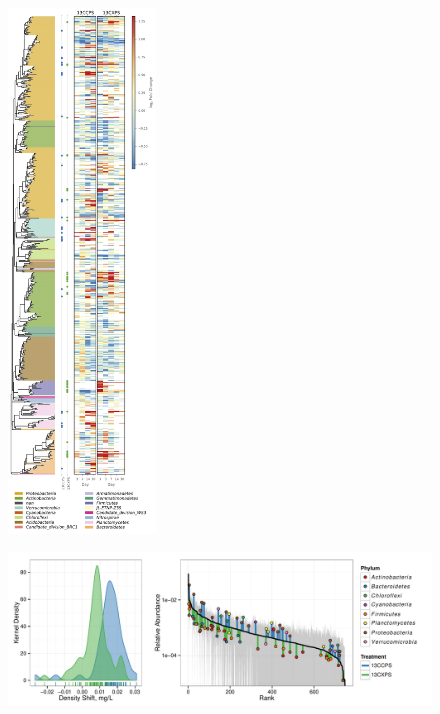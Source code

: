 \begin{figure}[H]
	\begin{center}
	\centerline{\includegraphics[width=0.35\textwidth]{figures/bacteria_tree/bacteria_tree.png}}
	\caption{\protect}
        \end{center}
	\label{fig:trees}
\end{figure}

\begin{figure}[H]
	\begin{center}
	\centerline{\includegraphics[width=\textwidth]{figures/shift_and_rabund2/shift_and_rabund2.pdf}}
	\caption{\protect}
        \end{center}
	\label{fig:shift}
\end{figure}
